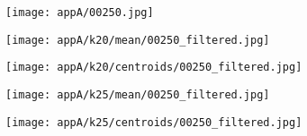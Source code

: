 \documentclass[draft,final]{vutinfth} %
\begin{document}
\begin{appendices}
\begin{figure}[h]
\centering
  \begin{subfigure}[b]{0.19\columnwidth}
    \centering
    \texttt{[image: appA/00250.jpg]}
  \end{subfigure}
  \begin{subfigure}[b]{0.19\columnwidth}
    \centering
    \texttt{[image: appA/k20/mean/00250\_filtered.jpg]}
  \end{subfigure}
  \begin{subfigure}[b]{0.19\columnwidth}
    \centering
    \texttt{[image: appA/k20/centroids/00250\_filtered.jpg]}
  \end{subfigure}
  \begin{subfigure}[b]{0.19\columnwidth}
    \centering
    \texttt{[image: appA/k25/mean/00250\_filtered.jpg]}
  \end{subfigure}
  \begin{subfigure}[b]{0.19\columnwidth}
    \centering
    \texttt{[image: appA/k25/centroids/00250\_filtered.jpg]}
  \end{subfigure}
\caption{}
\end{figure}  

\end{appendices}
\end{document}
